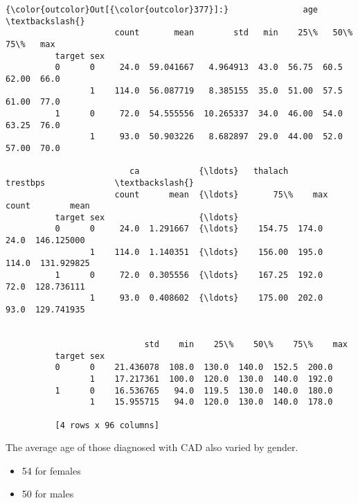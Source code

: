 \documentclass[11pt]{article}
\providecommand{\tightlist}{%
      \setlength{\itemsep}{0pt}\setlength{\parskip}{0pt}}
\begin{document}
\begin{Verbatim}[commandchars=\\\{\}]
{\color{outcolor}Out[{\color{outcolor}377}]:}               age                                                        \textbackslash{}
                      count       mean        std   min    25\%   50\%    75\%   max   
          target sex                                                                
          0      0     24.0  59.041667   4.964913  43.0  56.75  60.5  62.00  66.0   
                 1    114.0  56.087719   8.385155  35.0  51.00  57.5  61.00  77.0   
          1      0     72.0  54.555556  10.265337  34.0  46.00  54.0  63.25  76.0   
                 1     93.0  50.903226   8.682897  29.0  44.00  52.0  57.00  70.0   
          
                         ca            {\ldots}   thalach        trestbps              \textbackslash{}
                      count      mean  {\ldots}       75\%    max    count        mean   
          target sex                   {\ldots}                                         
          0      0     24.0  1.291667  {\ldots}    154.75  174.0     24.0  146.125000   
                 1    114.0  1.140351  {\ldots}    156.00  195.0    114.0  131.929825   
          1      0     72.0  0.305556  {\ldots}    167.25  192.0     72.0  128.736111   
                 1     93.0  0.408602  {\ldots}    175.00  202.0     93.0  129.741935   
          
                                                                    
                            std    min    25\%    50\%    75\%    max  
          target sex                                                
          0      0    21.436078  108.0  130.0  140.0  152.5  200.0  
                 1    17.217361  100.0  120.0  130.0  140.0  192.0  
          1      0    16.536765   94.0  119.5  130.0  140.0  180.0  
                 1    15.955715   94.0  120.0  130.0  140.0  178.0  
          
          [4 rows x 96 columns]
\end{Verbatim}
            
    The average age of those diagnosed with CAD also varied by gender.

\begin{itemize}
\tightlist
\item
  54 for females\\
\item
  50 for males
\end{itemize}
\end{document}
